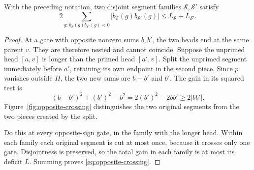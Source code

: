\begin{lemma}\label{lem:opposite-crossing}
With the preceding notation, two disjoint segment families
$\mathcal S,\mathcal S'$ satisfy
\begin{equation}\label{eq:opposite-crossing}
 2\sum_{g:\,b_{\mathcal S}(g)b_{\mathcal S'}(g)<0}
   |b_{\mathcal S}(g)b_{\mathcal S'}(g)|
 \le L_{\mathcal S}+L_{\mathcal S'}.
\end{equation}
\end{lemma}

\begin{proof}
At a gate with opposite nonzero sums $b,b'$, the two heads end at the
same parent $v$. They are therefore nested and cannot coincide.
Suppose the unprimed head $[a,v]$ is longer than the primed head
$[a',v]$. Split the unprimed segment immediately before $a'$, retaining
its own endpoint in the second piece. Since $p$ vanishes outside $H$,
the two new sums are $b-b'$ and $b'$. The gain in its squared test is
\[
 (b-b')^2+(b')^2-b^2=2(b')^2-2bb'\ge2|bb'|.
\]
Figure~\ref{fig:opposite-crossing} distinguishes the two original
segments from the two pieces created by the split.


Do this at every opposite-sign gate, in the family with the longer
head. Within each family each original segment is cut at most once,
because it crosses only one gate. Disjointness is preserved, so the
total gain in each family is at most its deficit $L$. Summing proves
\eqref{eq:opposite-crossing}.
\end{proof}

